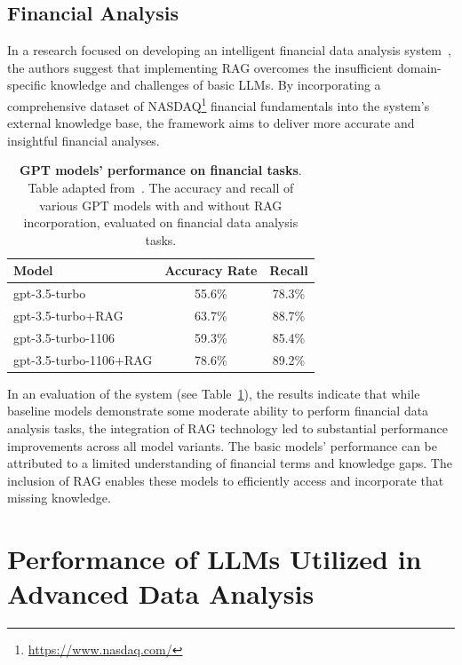 \documentclass{DESSThesis}
\begin{document}
\subsection{Financial Analysis}

In a research focused on developing an intelligent financial data analysis system~\cite{wang2025financialanalysisintelligentfinancial}, the authors suggest that implementing RAG overcomes the insufficient domain-specific knowledge and challenges of basic LLMs. By incorporating a comprehensive dataset of NASDAQ\footnote{\url{https://www.nasdaq.com/}} financial fundamentals into the system's external knowledge base, the framework aims to deliver more accurate and insightful financial analyses.

\begin{table}[ht]
\centering
\begin{tabular}{lcc}
\toprule
\textbf{Model} & \textbf{Accuracy Rate} & \textbf{Recall} \\
\midrule
gpt-3.5-turbo              & 55.6\% & 78.3\% \\
gpt-3.5-turbo+RAG          & 63.7\% & 88.7\% \\
gpt-3.5-turbo-1106         & 59.3\% & 85.4\% \\
gpt-3.5-turbo-1106+RAG     & 78.6\% & 89.2\% \\
\bottomrule
\end{tabular}
\caption[GPT models' performance on financial tasks]{\textbf{GPT models' performance on financial tasks}. Table adapted from~\cite{wang2025financialanalysisintelligentfinancial}. The accuracy and recall of various GPT models with and without RAG incorporation, evaluated on financial data analysis tasks.}
\label{tab:financial_analysis_res}
\end{table}

In an evaluation of the system (see Table~\ref{tab:financial_analysis_res}), the results indicate that while baseline models demonstrate some moderate ability to perform financial data analysis tasks, the integration of RAG technology led to substantial performance improvements across all model variants. The basic models' performance can be attributed to a limited understanding of financial terms and knowledge gaps. The inclusion of RAG enables these models to efficiently access and incorporate that missing knowledge.


\section{Performance of LLMs Utilized in Advanced Data Analysis}
\end{document}
